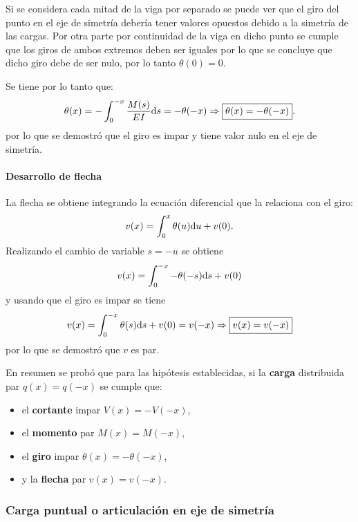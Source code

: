 Si se considera cada mitad de la viga por separado se puede ver que el giro del punto en el eje de simetría debería tener valores opuestos debido a la simetría de las cargas. %
%
Por otra parte por continuidad de la viga en dicho punto se cumple que los giros de ambos extremos deben ser iguales por lo que se concluye que dicho giro debe de ser nulo, por lo tanto $\theta(0) = 0$. 

Se tiene por lo tanto que:
%
\begin{equation}
  \theta(x) = - \int_{0}^{-x} \frac{ M(s)}{EI} {\text{d}} s =  -\theta(-x) \Rightarrow \boxed{\theta(x) = -\theta(-x)}.
\end{equation}
por lo que se demostró que el giro es impar y tiene valor nulo en el eje de simetría.

\paragraph{Desarrollo de flecha}
La flecha se obtiene integrando la ecuación diferencial que la relaciona con el giro:
%
\begin{equation}
v(x) = \int_{0}^{x} \theta(u) {\text{d}} u + v(0).
\end{equation}
%
Realizando el cambio de variable $s=-u$ se obtiene
\begin{equation}
v(x) = \int_{0}^{-x} -\theta(-s) {\text{d}} s + v(0)
\end{equation}
y usando que el giro es impar se tiene
\begin{equation}
v(x) = \int_{0}^{-x} \theta(s) {\text{d}} s + v(0) = v(-x)
\Rightarrow \boxed{
	v(x) = v(-x)
}
\end{equation}
por lo que se demostró que $v$ es par.

En resumen se probó que para las hipótesis establecidas, si la \textbf{carga} distribuida par $q(x) = q(-x)$ se cumple que: 
\begin{itemize}
	\item el \textbf{cortante} impar $V(x) = -V(-x)$,
	\item el \textbf{momento} par $M(x) = M(-x)$,
	\item el \textbf{giro} impar $\theta(x) = -\theta(-x)$,
	\item y la \textbf{flecha} par $v(x) = v(-x)$.
\end{itemize}


\subsubsection{Carga puntual o articulación en eje de simetría}

